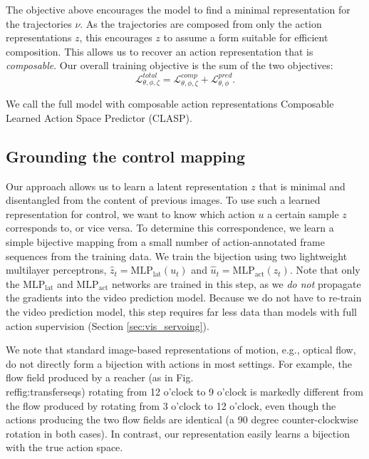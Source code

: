 \documentclass{article} %
\begin{document}
The objective above encourages the model to find a minimal representation for the trajectories $\nu$. As the trajectories are composed from only the action representations $z$, this encourages $z$ to assume a form suitable for efficient composition. This allows us to recover an action representation that is \textit{composable}. 
Our overall training objective is the sum of the two objectives:
\begin{equation}\mathcal{L}^{total}_{\theta,\phi,\zeta} = \mathcal{L}^{comp}_{\theta,\phi,\zeta} + \mathcal{L}^{pred}_{\theta,\phi}.\end{equation}

We call the full model with composable action representations Composable Learned Action Space Predictor (CLASP).

\subsection{Grounding the control mapping}
\label{sec:control_mapping}


Our approach allows us to learn a latent representation \(z\) that is minimal and disentangled from the content of previous images. 
To use such a learned representation for control, we want to know which action $u$ a certain sample $z$ corresponds to, or vice versa. %
To determine this correspondence, we learn a simple bijective mapping from a small number of action-annotated frame sequences from the training data. 
We train the bijection using two lightweight multilayer perceptrons, 
\(\hat{z}_t = \text{MLP}_\text{lat}(u_t)\) and  \(\hat{u}_t = \text{MLP}_\text{act}(z_t)\). 
Note that only the $\text{MLP}_\text{lat}$ and $\text{MLP}_\text{act}$ networks are trained in this step, as we \textit{do not} propagate the gradients into the video prediction model. Because we do not have to re-train the video prediction model, this step requires far less data than models with full action supervision (Section \ref{sec:vis_servoing}). 

We note that standard image-based representations of motion, e.g., optical flow, do not directly form a bijection with actions in most settings. For example, the flow field produced by a reacher (as in Fig.\\ref{fig:transferseqs}) rotating from 12 o’clock to 9 o’clock is markedly different from the flow produced by rotating from 3 o’clock to 12 o’clock, even though the actions producing the two flow fields are identical (a 90 degree counter-clockwise rotation in both cases). In contrast, our representation easily learns a bijection with the true action space.%
\end{document}
